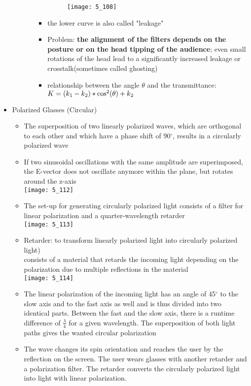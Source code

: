 \documentclass{standalone}
\begin{document}
\begin{itemize}
\begin{itemize}
\begin{itemize}
\begin{itemize}
					\begin{figure}[H]
						\centering
						\texttt{[image: 5\_108]}						
					\end{figure}

					\item the lower curve is also called "leakage"
					\item Problem: \textbf{the alignment of the filters depends on the posture or on the head tipping of the audience}; even small rotations of the head lead to a significantly increased leakage or crosstalk(sometimes called ghosting) 
					\item relationship between the angle $\theta$ and the transmittance: $ K = (k\textsubscript{1}-k\textsubscript{2})*\cos ^2(\theta)+k\textsubscript{2} $ 
				\end{itemize}
			\end{itemize} 
	\end{itemize}
	
	\item Polarized Glasses (Circular)
	\begin{itemize}
		\item The superposition of two linearly polarized waves, which are orthogonal to each other and which have a phase shift of 90$^{\circ}$, results in a circularly polarized wave
		\item If two sinusoidal oscillations with the same amplitude are superimposed, the E-vector does not oscillate anymore within the plane, but rotates around the z-axis \\
		\texttt{[image: 5\_112]}
		\item The set-up for generating circularly polarized light consists of a filter for linear polarization and a quarter-wavelength retarder \\
		\texttt{[image: 5\_113]}
		\item Retarder: to transform linearly polarized light into circularly polarized light) \\
		consists of a material that retards the incoming light depending on the polarization due to multiple reflections in the material \\
		\texttt{[image: 5\_114]}
		\item The linear polarization of the incoming light has an angle of 45$^{\circ}$ to the slow axis and to the fast axis as well and is thus divided into two identical parts. Between the fast and the slow axis, there is a runtime difference of $\frac{\lambda}{4}$ for a given wavelength. The superposition of both light paths gives the wanted circular polarization
		\item The wave changes its spin orientation and reaches the user by the reflection on the screen. The
user wears glasses with another retarder and a polarization filter. The retarder converts the circularly polarized light into light with linear polarization.
	\end{itemize}
	

\end{itemize}
\end{document}

